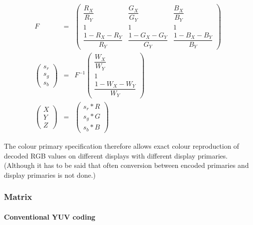 \begin{informative*}
\begin{eqnarray*}
F & = &
\left(
    \begin{array}{ccc}
    \dfrac{R_X}{R_Y} & \dfrac{G_X}{G_Y} & \dfrac{B_X}{B_Y} \\
    1 & 1 & 1 \\
    \dfrac{1-R_X-R_Y}{R_Y} & \dfrac{1-G_X-G_Y}{G_Y} & \dfrac{1-B_X-B_Y}{B_Y}
    \end{array}
\right)
\\
\left(
    \begin{array}{c}
    s_r \\
    s_g \\
    s_b
    \end{array}
\right ) & = & F^{-1}
\left(
    \begin{array}{c}
    \dfrac{W_X}{W_Y} \\
    1 \\
    \dfrac{1-W_X-W_Y}{W_Y}
    \end{array}
\right) 
\\
\left(
    \begin{array}{c}
    X \\
    Y \\
    Z
    \end{array}
\right) & = & 
\left(
    \begin{array}{c}
    s_r*R \\
    s_g*G \\
    s_b*B
    \end{array}
\right)
\end{eqnarray*}

The colour primary specification therefore allows exact colour
reproduction of decoded RGB values on different displays with different
display primaries. (Although it has to be said that often conversion between
encoded primaries and display primaries is not done.)

\subsubsection{Matrix}
\label{matrix}
\paragraph{Conventional YUV coding\\}


\end{informative*}
